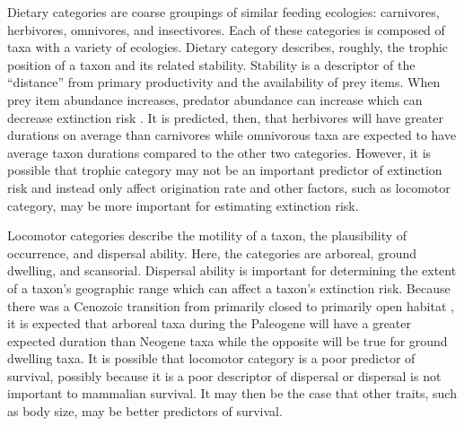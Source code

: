 \documentclass[12pt,letterpaper]{article}
\begin{document}
Dietary categories are coarse groupings of similar feeding ecologies: carnivores, herbivores, omnivores, and insectivores. Each of these categories is composed of taxa with a variety of ecologies. Dietary category describes, roughly, the trophic position of a taxon and its related stability. Stability is a descriptor of the ``distance'' from primary productivity and the availability of prey items. When prey item abundance increases, predator abundance can increase \citep{VanValen1989,Brown1987,Damuth1979,Silva1997,Janis2000} which can decrease extinction risk \citep{Jernvall2004,Brown1984,Jernvall2002,Fortelius2002}. It is predicted, then, that herbivores will have greater durations on average than carnivores while omnivorous taxa are expected to have average taxon durations compared to the other two categories. However, it is possible that trophic category may not be an important predictor of extinction risk and instead only affect origination rate \citep{Price2012} and other factors, such as locomotor category, may be more important for estimating extinction risk.

Locomotor categories describe the motility of a taxon, the plausibility of occurrence, and dispersal ability. Here, the categories are arboreal, ground dwelling, and scansorial. Dispersal ability is important for determining the extent of a taxon's geographic range \citep{Birand2012,Jablonski2006a,Gaston2009} which can affect a taxon's extinction risk. Because there was a Cenozoic transition from primarily closed to primarily open habitat \cite{Stromberg2005,Stromberg2013,Janis1993a,Blois2009,Rose2006}, it is expected that arboreal taxa during the Paleogene will have a greater expected duration than Neogene taxa while the opposite will be true for ground dwelling taxa. It is possible that locomotor category is a poor predictor of survival, possibly because it is a poor descriptor of dispersal or dispersal is not important to mammalian survival. It may then be the case that other traits, such as body size, may be better predictors of survival. 
\end{document}
